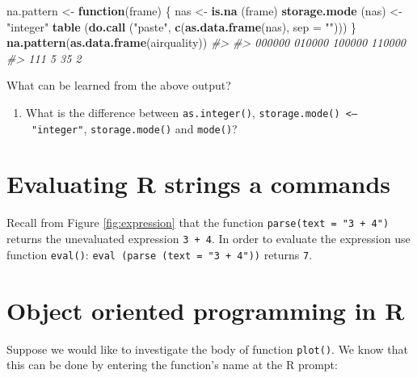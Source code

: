 \documentclass[
]{book}
\newenvironment{Shaded}{\begin{snugshade}}{\end{snugshade}}
\newcommand{\AttributeTok}[1]{\textcolor[rgb]{0.13,0.29,0.53}{#1}}
\newcommand{\CommentTok}[1]{\textcolor[rgb]{0.56,0.35,0.01}{\textit{#1}}}
\newcommand{\ControlFlowTok}[1]{\textcolor[rgb]{0.13,0.29,0.53}{\textbf{#1}}}
\newcommand{\FunctionTok}[1]{\textcolor[rgb]{0.13,0.29,0.53}{\textbf{#1}}}
\newcommand{\NormalTok}[1]{#1}
\newcommand{\OtherTok}[1]{\textcolor[rgb]{0.56,0.35,0.01}{#1}}
\newcommand{\StringTok}[1]{\textcolor[rgb]{0.31,0.60,0.02}{#1}}
\providecommand{\tightlist}{%
  \setlength{\itemsep}{0pt}\setlength{\parskip}{0pt}}
\begin{document}
\begin{Shaded}
\begin{Highlighting}[]
\NormalTok{na.pattern }\OtherTok{\textless{}{-}} \ControlFlowTok{function}\NormalTok{(frame)}
\NormalTok{\{ nas }\OtherTok{\textless{}{-}} \FunctionTok{is.na}\NormalTok{ (frame)}
  \FunctionTok{storage.mode}\NormalTok{ (nas) }\OtherTok{\textless{}{-}} \StringTok{"integer"}
  \FunctionTok{table}\NormalTok{ (}\FunctionTok{do.call}\NormalTok{ (}\StringTok{"paste"}\NormalTok{, }\FunctionTok{c}\NormalTok{(}\FunctionTok{as.data.frame}\NormalTok{(nas), }\AttributeTok{sep =} \StringTok{""}\NormalTok{)))}
\NormalTok{\}}
\FunctionTok{na.pattern}\NormalTok{(}\FunctionTok{as.data.frame}\NormalTok{(airquality))}
\CommentTok{\#\textgreater{} }
\CommentTok{\#\textgreater{} 000000 010000 100000 110000 }
\CommentTok{\#\textgreater{}    111      5     35      2}
\end{Highlighting}
\end{Shaded}

What can be learned from the above output?

\begin{enumerate}
\def\labelenumi{(\alph{enumi})}
\setcounter{enumi}{3}
\tightlist
\item
  What is the difference between \texttt{as.integer()}, \texttt{storage.mode()\ \textless{}–\ "integer"}, \texttt{storage.mode()} and \texttt{mode()}?
\end{enumerate}

\section{Evaluating R strings a commands}\label{evaluating-r-strings-a-commands}

Recall from Figure \ref{fig:expression} that the function \texttt{parse(text\ =\ "3\ +\ 4")} returns the unevaluated expression \texttt{3\ +\ 4}. In order to evaluate the expression use function \texttt{eval()}: \texttt{eval\ (parse\ (text\ =\ "3\ +\ 4"))} returns \texttt{7}.

\section{Object oriented programming in R}\label{object-oriented-programming-in-r}

Suppose we would like to investigate the body of function \texttt{plot()}. We know that this can be done by entering the function's name at the R prompt:
\end{document}

